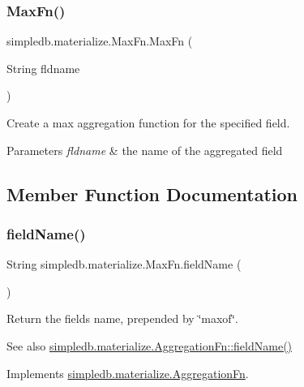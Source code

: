 \subsubsection{\texorpdfstring{Max\+Fn()}{MaxFn()}}
{\footnotesize\ttfamily simpledb.\+materialize.\+Max\+Fn.\+Max\+Fn (\begin{DoxyParamCaption}\item[{String}]{fldname }\end{DoxyParamCaption})\hspace{0.3cm}{\ttfamily [inline]}}

Create a max aggregation function for the specified field. 
\begin{DoxyParams}{Parameters}
{\em fldname} & the name of the aggregated field \\
\hline
\end{DoxyParams}


\subsection{Member Function Documentation}
\mbox{\label{classsimpledb_1_1materialize_1_1MaxFn_a51dc995821073599a8780df18b86ae9f}} 
\subsubsection{\texorpdfstring{field\+Name()}{fieldName()}}
{\footnotesize\ttfamily String simpledb.\+materialize.\+Max\+Fn.\+field\+Name (\begin{DoxyParamCaption}{ }\end{DoxyParamCaption})\hspace{0.3cm}{\ttfamily [inline]}}

Return the field\textquotesingle{}s name, prepended by \char`\"{}maxof\char`\"{}. \begin{DoxySeeAlso}{See also}
\hyperlink{interfacesimpledb_1_1materialize_1_1AggregationFn_a03cbdf13e41c3e6ea0b8a76863cd58cf}{simpledb.\+materialize.\+Aggregation\+Fn\+::field\+Name()} 
\end{DoxySeeAlso}


Implements \hyperlink{interfacesimpledb_1_1materialize_1_1AggregationFn_a03cbdf13e41c3e6ea0b8a76863cd58cf}{simpledb.\+materialize.\+Aggregation\+Fn}.

